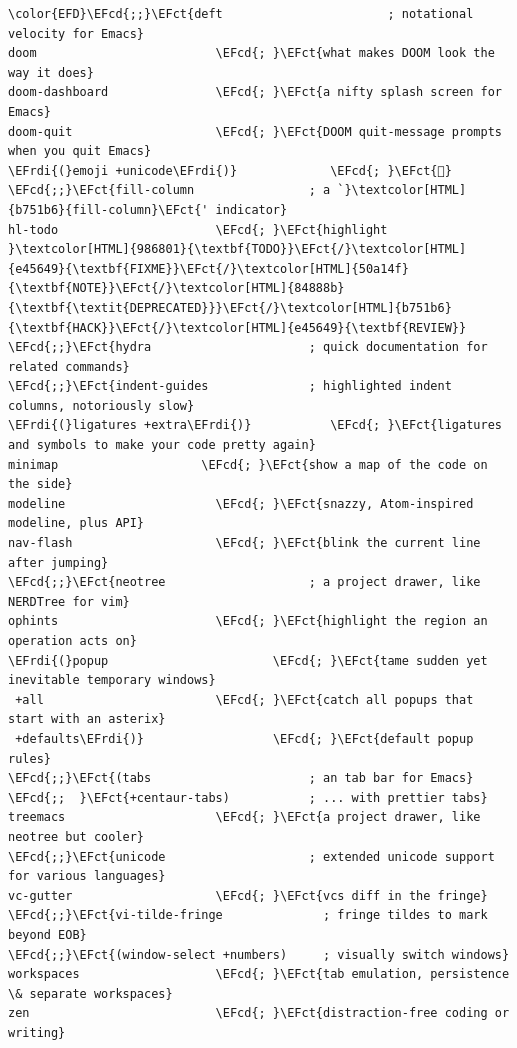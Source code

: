 \documentclass{scrartcl}
\newcommand{\EFct}[1]{\textcolor{EFct}{#1}} %
\newcommand{\EFcd}[1]{\textcolor{EFcd}{#1}} %
\newcommand{\EFrdi}[1]{\textcolor{EFrdi}{#1}} %
\begin{document}
\begin{enumerate}
\begin{Code}
\begin{Verbatim}[]
\color{EFD}\EFcd{;;}\EFct{deft                       ; notational velocity for Emacs}
doom                         \EFcd{; }\EFct{what makes DOOM look the way it does}
doom-dashboard               \EFcd{; }\EFct{a nifty splash screen for Emacs}
doom-quit                    \EFcd{; }\EFct{DOOM quit-message prompts when you quit Emacs}
\EFrdi{(}emoji +unicode\EFrdi{)}             \EFcd{; }\EFct{🙂}
\EFcd{;;}\EFct{fill-column                ; a `}\textcolor[HTML]{b751b6}{fill-column}\EFct{' indicator}
hl-todo                      \EFcd{; }\EFct{highlight }\textcolor[HTML]{986801}{\textbf{TODO}}\EFct{/}\textcolor[HTML]{e45649}{\textbf{FIXME}}\EFct{/}\textcolor[HTML]{50a14f}{\textbf{NOTE}}\EFct{/}\textcolor[HTML]{84888b}{\textbf{\textit{DEPRECATED}}}\EFct{/}\textcolor[HTML]{b751b6}{\textbf{HACK}}\EFct{/}\textcolor[HTML]{e45649}{\textbf{REVIEW}}
\EFcd{;;}\EFct{hydra                      ; quick documentation for related commands}
\EFcd{;;}\EFct{indent-guides              ; highlighted indent columns, notoriously slow}
\EFrdi{(}ligatures +extra\EFrdi{)}           \EFcd{; }\EFct{ligatures and symbols to make your code pretty again}
minimap                    \EFcd{; }\EFct{show a map of the code on the side}
modeline                     \EFcd{; }\EFct{snazzy, Atom-inspired modeline, plus API}
nav-flash                    \EFcd{; }\EFct{blink the current line after jumping}
\EFcd{;;}\EFct{neotree                    ; a project drawer, like NERDTree for vim}
ophints                      \EFcd{; }\EFct{highlight the region an operation acts on}
\EFrdi{(}popup                       \EFcd{; }\EFct{tame sudden yet inevitable temporary windows}
 +all                        \EFcd{; }\EFct{catch all popups that start with an asterix}
 +defaults\EFrdi{)}                  \EFcd{; }\EFct{default popup rules}
\EFcd{;;}\EFct{(tabs                      ; an tab bar for Emacs}
\EFcd{;;  }\EFct{+centaur-tabs)           ; ... with prettier tabs}
treemacs                     \EFcd{; }\EFct{a project drawer, like neotree but cooler}
\EFcd{;;}\EFct{unicode                    ; extended unicode support for various languages}
vc-gutter                    \EFcd{; }\EFct{vcs diff in the fringe}
\EFcd{;;}\EFct{vi-tilde-fringe              ; fringe tildes to mark beyond EOB}
\EFcd{;;}\EFct{(window-select +numbers)     ; visually switch windows}
workspaces                   \EFcd{; }\EFct{tab emulation, persistence \& separate workspaces}
zen                          \EFcd{; }\EFct{distraction-free coding or writing}
\end{Verbatim}
\end{Code}


\end{enumerate}
\end{document}
